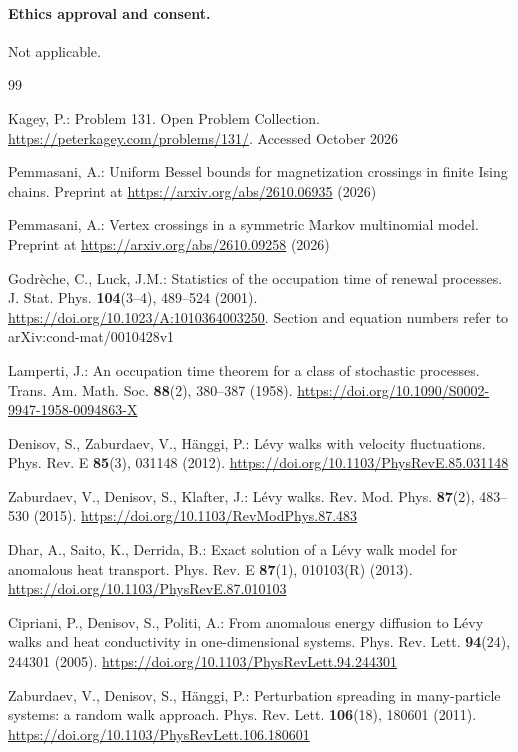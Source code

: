 \documentclass[11pt]{article}
\theoremstyle{definition}
\theoremstyle{remark}
\begin{document}
\paragraph{Ethics approval and consent.} Not applicable.

\begin{thebibliography}{99}\small\setlength{\baselineskip}{11pt}\setlength{\itemsep}{0pt}\setlength{\parsep}{0pt}

Kagey, P.: Problem 131. Open Problem Collection.
\url{https://peterkagey.com/problems/131/}. Accessed October 2026

Pemmasani, A.: Uniform Bessel bounds for magnetization crossings in finite
Ising chains. Preprint at \url{https://arxiv.org/abs/2610.06935} (2026)

Pemmasani, A.: Vertex crossings in a symmetric Markov multinomial model.
Preprint at \url{https://arxiv.org/abs/2610.09258} (2026)

Godr\`eche, C., Luck, J.M.: Statistics of the occupation time of renewal
processes. J. Stat. Phys. \textbf{104}(3--4), 489--524 (2001).
\url{https://doi.org/10.1023/A:1010364003250}. Section and equation numbers
refer to arXiv:cond-mat/0010428v1

Lamperti, J.: An occupation time theorem for a class of stochastic processes.
Trans. Am. Math. Soc. \textbf{88}(2), 380--387 (1958).
\url{https://doi.org/10.1090/S0002-9947-1958-0094863-X}

Denisov, S., Zaburdaev, V., H\"anggi, P.: L\'evy walks with velocity
fluctuations. Phys. Rev. E \textbf{85}(3), 031148 (2012).
\url{https://doi.org/10.1103/PhysRevE.85.031148}

Zaburdaev, V., Denisov, S., Klafter, J.: L\'evy walks. Rev. Mod. Phys.
\textbf{87}(2), 483--530 (2015).
\url{https://doi.org/10.1103/RevModPhys.87.483}

Dhar, A., Saito, K., Derrida, B.: Exact solution of a L\'evy walk model for
anomalous heat transport. Phys. Rev. E \textbf{87}(1), 010103(R) (2013).
\url{https://doi.org/10.1103/PhysRevE.87.010103}

Cipriani, P., Denisov, S., Politi, A.: From anomalous energy diffusion to
L\'evy walks and heat conductivity in one-dimensional systems. Phys. Rev.
Lett. \textbf{94}(24), 244301 (2005).
\url{https://doi.org/10.1103/PhysRevLett.94.244301}

Zaburdaev, V., Denisov, S., H\"anggi, P.: Perturbation spreading in
many-particle systems: a random walk approach. Phys. Rev. Lett.
\textbf{106}(18), 180601 (2011).
\url{https://doi.org/10.1103/PhysRevLett.106.180601}


\end{thebibliography}
\end{document}
